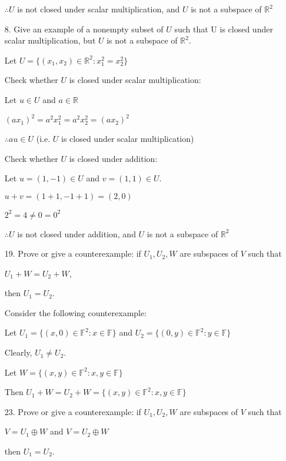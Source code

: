\documentclass{article}
\begin{document}
\begin{enumerate}[nolistsep]
		$\therefore U$ is not closed under scalar multiplication, and $U$ is not a subspace of $\mathbb{R}^2$
		
		\item[8.] Give an example of a nonempty subset of $U$ such that U is closed under scalar multiplication, but $U$ is not a subspace of $\mathbb{R}^2$.
		
		Let $U = \{(x_1, x_2) \in \mathbb{R}^2 : x_1^2 = x_2^2\}$
		
		Check whether $U$ is closed under scalar multiplication:
		
		Let $u \in U$ and $a \in \mathbb{R}$
		
		$(ax_1)^2 = a^2x_1^2 = a^2x_2^2 = (ax_2)^2$
		
		$\therefore au \in U$ (i.e. $U$ is closed under scalar multiplication)
		
		Check whether $U$ is closed under addition:
		
		Let $u = (1, -1) \in U$ and $v = (1, 1) \in U$.
		
		$u + v = (1 + 1, -1 + 1) = (2, 0)$
		
		$2^2 = 4 \neq 0 = 0^2$
		
		$\therefore U$ is not closed under addition, and $U$ is not a subspace of $\mathbb{R}^2$
		
		\item[19.] Prove or give a counterexample: if $U_1, U_2, W$ are subspaces of $V$ such that
		
\centerline{$U_1 + W = U_2 + W$,}

then $U_1 = U_2$. 
		
		Consider the following counterexample:

		Let $U_1 = \{(x, 0) \in \mathbb{F}^2 : x \in \mathbb{F}\}$ and $U_2 = \{(0, y) \in \mathbb{F}^2 : y \in \mathbb{F}\}$
		
		Clearly, $U_1 \neq U_2$.
		
		Let $W = \{(x, y) \in \mathbb{F}^2 : x, y \in \mathbb{F}\}$
		
		Then $U_1 + W = U_2 + W = \{(x, y) \in \mathbb{F}^2 : x, y \in \mathbb{F}\}$
		
		\item[23.] Prove or give a counterexample: if $U_1, U_2, W$ are subspaces of $V$ such that
		
		\centerline{$V = U_1 \oplus W$ and $V = U_2 \oplus W$}
		
		then $U_1 = U_2$.
		
	\end{enumerate}
\end{document}

